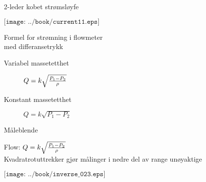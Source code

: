 \documentclass[avery5388,grid,frame]{flashcards}
\begin{document}



\begin{flashcard}{2-leder kobet strømsløyfe}

$\texttt{[image: ../book/current11.eps]}$
\end{flashcard}

\begin{flashcard}{Formel for strømning i flowmeter \\ med differansetrykk}

  \begin{description}
    \item [Variabel massetetthet] $Q = k \sqrt{{P_1 - P_2} \over \rho}$ 
    \item [Konstant massetetthet] $Q = k \sqrt{P_1 - P_2 }$ 
  \end{description}


\end{flashcard}

\begin{flashcard}{Måleblende}
	\begin{minipage}{0.35\textwidth}
	Flow: $Q = k \sqrt{{P_1 - P_2} \over \rho}$ 
	\\
	Kvadratrotuttrekker gjør målinger i nedre del av range unøyaktige
	\end{minipage}
	\begin{minipage}{0.65\textwidth}
$\texttt{[image: ../book/inverse\_023.eps]}$
	\end{minipage}


\end{flashcard}
\end{document}
